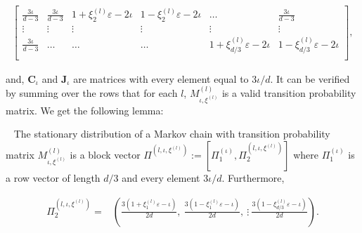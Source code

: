 \documentclass[opre,sglanonrev]{informs4}
\numberwithin{equation}{section}
\newcommand{\pow}[1]{^{(#1)}}
\newcommand{\lp}{\left(}
\newcommand{\rp}{\right)}
\newcommand{\lb}{\left[}
\newcommand{\rb}{\right]}
\newcommand{\ldot}{\left.}
\newcommand{\rdot}{\right.}
\newcommand{\eps}{\varepsilon}
\begin{document}
\begin{APPENDICES}
{\begin{small}
\begin{align*}
\begin{bmatrix}
\frac{3\iota}{d-3} & \frac{3\iota}{d-3} & 1 + \xi^{(l)}_2 \eps-2\iota & 1-  \xi^{(l)}_2 \eps -2\iota  & \hdots & \frac{3\iota}{d-3} \\
\vdots & \vdots & \vdots  & \vdots & \vdots & \vdots \\
\frac{3\iota}{d-3} & \hdots & \hdots & \hdots & 1 +  \xi^{(l)}_{d/3} \eps -2\iota & 1-  \xi^{(l)}_{d/3} \eps-2\iota\\
\end{bmatrix},
\end{align*}
\end{small}
and, $\boldsymbol{C}_\iota$  and $\boldsymbol{J}_\iota$ are matrices with every element equal to $3\iota/d$. 
It can be verified by summing over the rows that for each $l$, $M_{\iota,\xi\pow{l}}\pow{l}$ is a valid transition probability matrix.
We get the following lemma:
\begin{lemma}~\label{lemma:stationary-dist}
The stationary distribution of a Markov chain with transition probability matrix $M_{\iota,\xi\pow{l}}\pow{l}$ is a block vector $\Pi\pow{l,\iota,\xi\pow{l}}:=\lb \Pi\pow{\iota}_1,\Pi_2\pow{l,\iota,\xi\pow{l}}\rb$ where $ \Pi_1\pow{\iota}$ is a row vector of length $d/3$ and every element $3\iota/d$. Furthermore, 
\begin{small}
\begin{align*}
    \Pi_2\pow{l,\iota,\xi\pow{l}} =  & \lp\frac{ 3(1+\xi_1\pow{l}\eps-\iota)}{2d}\rdot,\ \frac{3(1-\xi_1\pow{l}\eps-\iota)}{2d},\ \vdots\ \ldot\frac{3(1-\xi_{d/3}\pow{l}\eps-\iota)}{2d} \rp.
\end{align*}
\end{small}
\end{lemma}

}
\end{APPENDICES}
\end{document}
